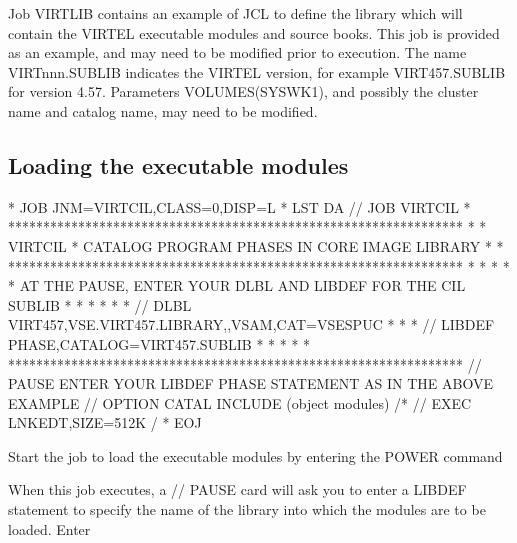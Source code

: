 \documentclass[letterpaper,10pt,english]{sphinxmanual}
\begin{document}
Job VIRTLIB contains an example of JCL to define the library which will contain the VIRTEL executable modules and source books. This job is provided as an example, and may need to be modified prior to execution. The name VIRTnnn.SUBLIB indicates the VIRTEL version, for example VIRT457.SUBLIB for version 4.57. Parameters VOLUMES(SYSWK1), and possibly the cluster name and catalog name, may need to be modified.


\subsection{Loading the executable modules}
\label{\detokenize{Installation_Guide:loading-the-executable-modules}}
\begin{sphinxVerbatim}[commandchars=\\\{\}]
* \PYGZdl{}\PYGZdl{} JOB JNM=VIRTCIL,CLASS=0,DISP=L
* \PYGZdl{}\PYGZdl{} LST DA
// JOB VIRTCIL
* *****************************************************************
* * VIRTCIL * CATALOG PROGRAM PHASES IN CORE IMAGE LIBRARY        *
* *****************************************************************
* *                                                               *
* * AT THE PAUSE, ENTER YOUR DLBL AND LIBDEF FOR THE CIL SUBLIB   *
* *                                                               *
* * // DLBL VIRT457,\PYGZsq{}VSE.VIRT457.LIBRARY\PYGZsq{},,VSAM,CAT=VSESPUC       *
* * // LIBDEF PHASE,CATALOG=VIRT457.SUBLIB                        *
* *                                                               *
* *****************************************************************
// PAUSE ENTER YOUR LIBDEF PHASE STATEMENT AS IN THE ABOVE EXAMPLE
// OPTION CATAL
        INCLUDE
        (object modules)
/*
// EXEC LNKEDT,SIZE=512K
/\PYGZam{}
* \PYGZdl{}\PYGZdl{} EOJ
\end{sphinxVerbatim}


Start the job to load the executable modules by entering the POWER command

\begin{sphinxVerbatim}[commandchars=\\\{\}]
 
\end{sphinxVerbatim}

When this job executes, a // PAUSE card will ask you to enter a LIBDEF statement to specify the name of the library into which the modules are to be loaded. Enter
\end{document}
